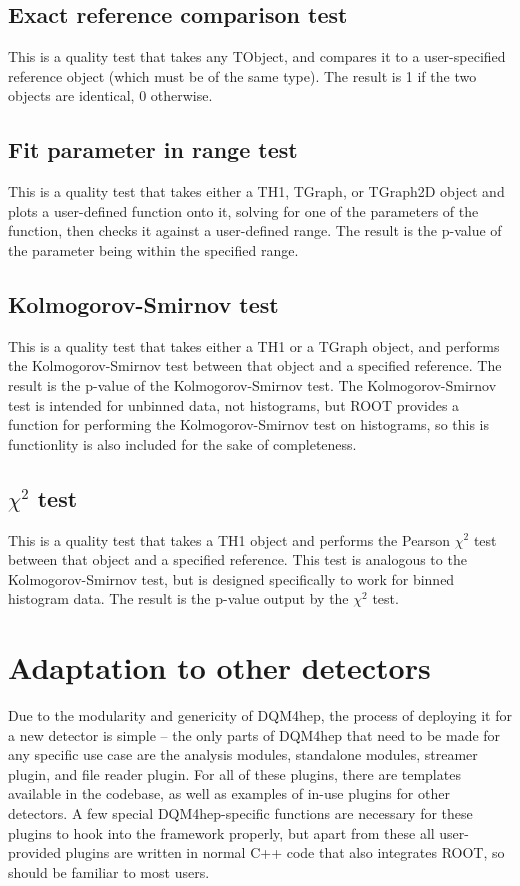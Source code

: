 \subsection{Exact reference comparison test}
This is a quality test that takes any TObject, and compares it to a user-specified reference object (which must be of the same type). The result is 1 if the two objects are identical, 0 otherwise. 

\subsection{Fit parameter in range test}
This is a quality test that takes either a TH1, TGraph, or TGraph2D object and plots a user-defined function onto it, solving for one of the parameters of the function, then checks it against a user-defined range. The result is the p-value of the parameter being within the specified range.

\subsection{Kolmogorov-Smirnov test}
This is a quality test that takes either a TH1 or a TGraph object, and performs the Kolmogorov-Smirnov test between that object and a specified reference. The result is the p-value of the Kolmogorov-Smirnov test. The Kolmogorov-Smirnov test is intended for unbinned data, not histograms, but ROOT provides a function for performing the Kolmogorov-Smirnov test on histograms, so this is functionlity is also included for the sake of completeness.

\subsection{$\chi^2$ test}
This is a quality test that takes a TH1 object and performs the Pearson $\chi^2$ test between that object and a specified reference. This test is analogous to the Kolmogorov-Smirnov test, but is designed specifically to work for binned histogram data. The result is the p-value output by the $\chi^2$ test. 


\section{Adaptation to other detectors}
Due to the modularity and genericity of DQM4hep, the process of deploying it for a new detector is simple -- the only parts of DQM4hep that need to be made for any specific use case are the analysis modules, standalone modules, streamer plugin, and file reader plugin. For all of these plugins, there are templates available in the codebase, as well as examples of in-use plugins for other detectors. A few special DQM4hep-specific functions are necessary for these plugins to hook into the framework properly, but apart from these all user-provided plugins are written in normal C++ code that also integrates ROOT, so should be familiar to most users.

